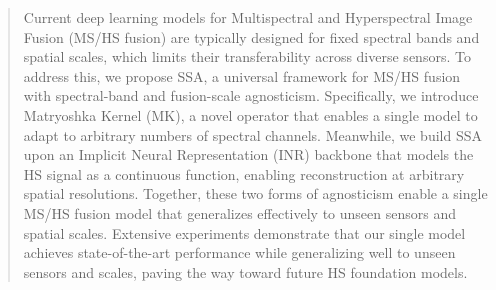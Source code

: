 \begin{abstract}
Current deep learning models for Multispectral and Hyperspectral Image Fusion (MS/HS fusion) are typically designed for fixed spectral bands and spatial scales, which limits their transferability across diverse sensors. To address this, we propose SSA, a universal framework for MS/HS fusion with spectral-band and fusion-scale agnosticism. Specifically, we introduce Matryoshka Kernel (MK), a novel operator that enables a single model to adapt to arbitrary numbers of spectral channels. Meanwhile, we build SSA upon an Implicit Neural Representation (INR) backbone that models the HS signal as a continuous function, enabling reconstruction at arbitrary spatial resolutions. Together, these two forms of agnosticism enable a single MS/HS fusion model that generalizes effectively to unseen sensors and spatial scales. Extensive experiments demonstrate that our single model achieves state-of-the-art performance while generalizing well to unseen sensors and scales, paving the way toward future HS foundation models.
\end{abstract}